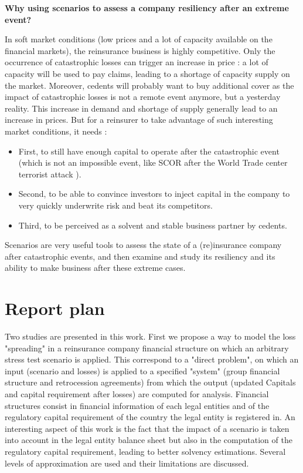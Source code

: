 \smallbreak
\textbf{Why using scenarios to assess a company resiliency after an extreme event?}
\smallbreak

In soft market conditions (low prices and a lot of capacity available on the financial markets), the reinsurance business is highly competitive. Only the occurrence of catastrophic losses can trigger an increase in price : a lot of capacity will be used to pay claims, leading to a shortage of capacity supply on the market. Moreover, cedents will probably want to buy additional cover as the impact of catastrophic losses is not a remote event anymore, but a yesterday reality. This increase in demand and shortage of supply generally lead to an increase in prices. But for a reinsurer to take advantage of such interesting market conditions, it needs :

\begin{itemize}
\item First, to still have enough capital to operate after the catastrophic event (which is not an impossible event, like SCOR after the World Trade center terrorist attack \cite{Brug2006}).
\item Second, to be able to convince investors to inject capital in the company to very quickly underwrite risk and beat its competitors.
\item Third, to be perceived as a solvent and stable business partner by cedents.
\end{itemize}

Scenarios are very useful tools to assess the state of a (re)insurance company after catastrophic events, and then examine and study its resiliency and its ability to make business after these extreme cases.


\section{Report plan}

Two studies are presented in this work. First we propose a way to model the loss "spreading" in a reinsurance company financial structure on which an arbitrary stress test scenario is applied. This correspond to a "direct problem", on which an input (scenario and losses) is applied to a specified "system" (group financial structure and retrocession agreements) from which the output (updated Capitals and capital requirement after losses) are computed for analysis. Financial structures consist in financial information of each legal entities and of the regulatory capital requirement of the country the legal entity is registered in. An interesting aspect of this work is the fact that the impact of a scenario is taken into account in the legal entity balance sheet but also in the computation of the regulatory capital requirement, leading to better solvency estimations. Several levels of approximation are used and their limitations are discussed.

